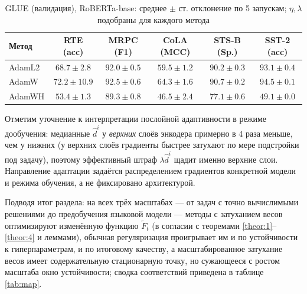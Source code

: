 \begin{table}[h!]
\centering
\caption{GLUE (валидация), RoBERTa-base: среднее $\pm$ ст. отклонение по 5 запускам; $\eta, \lambda$ подобраны для каждого метода}
\label{tab:glue}
\small
\setlength{\tabcolsep}{4pt}
\begin{tabular}{lccccc}
\toprule
Метод & RTE (acc) & MRPC (F1) & CoLA (MCC) & STS-B (Sp.) & SST-2 (acc) \\
\midrule
AdamL2 & $68.7 \pm 2.8$ & $92.0 \pm 0.5$ & $59.5 \pm 1.2$ & $90.2 \pm 0.3$ & $93.1 \pm 0.4$ \\
AdamW & $\mathbf{72.2 \pm 10.9}$ & $\mathbf{92.5 \pm 0.6}$ & $\mathbf{64.3 \pm 1.6}$ & $\mathbf{90.7 \pm 0.2}$ & $\mathbf{94.5 \pm 0.1}$ \\
AdamWH & $53.4 \pm 1.3$ & $89.3 \pm 0.8$ & $46.5 \pm 2.4$ & $77.1 \pm 0.6$ & $49.1 \pm 0.0$ \\
\bottomrule
\end{tabular}
\end{table}

Отметим уточнение к интерпретации послойной адаптивности в режиме дообучения: медианные $\hat d^i$ у \emph{верхних} слоёв энкодера примерно в $4$ раза меньше, чем у нижних (у верхних слоёв градиенты быстрее затухают по мере подстройки под задачу), поэтому эффективный штраф $\lambda \hat d^i$ щадит именно верхние слои. Направление адаптации задаётся распределением градиентов конкретной модели и режима обучения, а не фиксировано архитектурой.

Подводя итог раздела: на всех трёх масштабах --- от задач с точно вычислимыми решениями до предобучения языковой модели --- методы с затуханием весов оптимизируют изменённую функцию $\widetilde{F}_t$ (в согласии с теоремами \ref{theor:1}--\ref{theor:4} и леммами), обычная регуляризация проигрывает им и по устойчивости к гиперпараметрам, и по итоговому качеству, а масштабированное затухание весов имеет содержательную стационарную точку, но сужающееся с ростом масштаба окно устойчивости; сводка соответствий приведена в таблице \ref{tab:map}.
